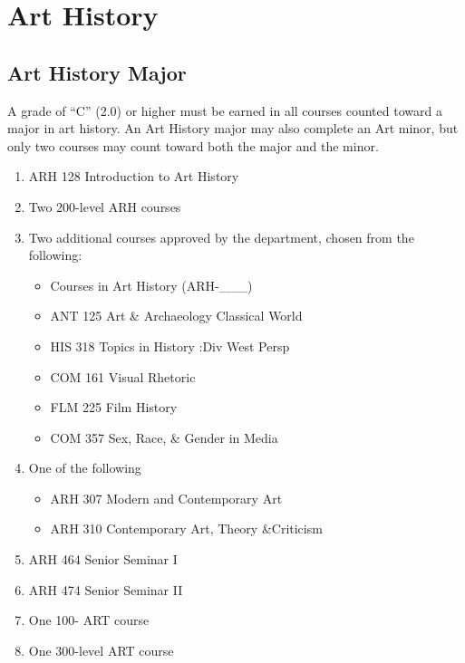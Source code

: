 \documentclass[
  letterpaper,
]{scrbook}
\providecommand{\tightlist}{%
  \setlength{\itemsep}{0pt}\setlength{\parskip}{0pt}}
\begin{document}
\section{Art History}\label{art-history}

\subsection{Art History Major}\label{art-history-major}

A grade of ``C'' (2.0) or higher must be earned in all courses counted
toward a major in art history. An Art History major may also complete an
Art minor, but only two courses may count toward both the major and the
minor.

\begin{enumerate}
\def\labelenumi{\arabic{enumi}.}
\tightlist
\item
  ARH 128 Introduction to Art History\\
\item
  Two 200-level ARH courses\\
\item
  Two additional courses approved by the department, chosen from the
  following:

  \begin{itemize}
  \tightlist
  \item
    Courses in Art History (ARH-\_\_\_)\\
  \item
    ANT 125 Art \& Archaeology Classical World\\
  \item
    HIS 318 Topics in History :Div West Persp\\
  \item
    COM 161 Visual Rhetoric\\
  \item
    FLM 225 Film History\\
  \item
    COM 357 Sex, Race, \& Gender in Media\\
  \end{itemize}
\item
  One of the following

  \begin{itemize}
  \tightlist
  \item
    ARH 307 Modern and Contemporary Art\\
  \item
    ARH 310 Contemporary Art, Theory \&Criticism\\
  \end{itemize}
\item
  ARH 464 Senior Seminar I\\
\item
  ARH 474 Senior Seminar II\\
\item
  One 100- ART course\\
\item
  One 300-level ART course
\end{enumerate}
\end{document}
